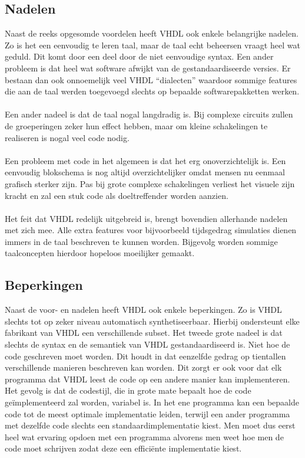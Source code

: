 \subsection{Nadelen}
Naast de reeks opgesomde voordelen heeft VHDL ook enkele belangrijke nadelen. Zo is het een eenvoudig te leren taal, maar de taal echt beheersen vraagt heel wat geduld. Dit komt door een deel door de niet eenvoudige syntax. Een ander probleem is dat heel wat software afwijkt van de gestandaardiseerde versies. Er bestaan dan ook onnoemelijk veel VHDL ``dialecten'' waardoor sommige features die aan de taal werden toegevoegd slechts op bepaalde softwarepakketten werken.
\paragraph{}
Een ander nadeel is dat de taal nogal langdradig is. Bij complexe circuits zullen de groeperingen zeker hun effect hebben, maar om kleine schakelingen te realiseren is nogal veel code nodig.
\paragraph{}
Een probleem met code in het algemeen is dat het erg onoverzichtelijk is. Een eenvoudig blokschema is nog altijd overzichtelijker omdat mensen nu eenmaal grafisch sterker zijn. Pas bij grote complexe schakelingen verliest het visuele zijn kracht en zal een stuk code als doeltreffender worden aanzien.
\paragraph{}
Het feit dat VHDL redelijk uitgebreid is, brengt bovendien allerhande nadelen met zich mee. Alle extra features voor bijvoorbeeld tijdsgedrag simulaties dienen immers in de taal beschreven te kunnen worden. Bijgevolg worden sommige taalconcepten hierdoor hopeloos moeilijker gemaakt.
\subsection{Beperkingen}
Naast de voor- en nadelen heeft VHDL ook enkele beperkingen. Zo is VHDL slechts tot op zeker niveau automatisch synthetiseerbaar. Hierbij ondersteunt elke fabrikant van VHDL een verschillende subset. Het tweede grote nadeel is dat slechts de syntax en de semantiek van VHDL gestandaardiseerd is. Niet hoe de code geschreven moet worden. Dit houdt in dat eenzelfde gedrag op tientallen verschillende manieren beschreven kan worden. Dit zorgt er ook voor dat elk programma dat VHDL leest de code op een andere manier kan implementeren. Het gevolg is dat de codestijl, die in grote mate bepaalt hoe de code ge\"implementeerd zal worden, variabel is. In het ene programma kan een bepaalde code tot de meest optimale implementatie leiden, terwijl een ander programma met dezelfde code slechts een standaardimplementatie kiest. Men moet dus eerst heel wat ervaring opdoen met een programma alvorens men weet hoe men de code moet schrijven zodat deze een effici\"ente implementatie kiest.
